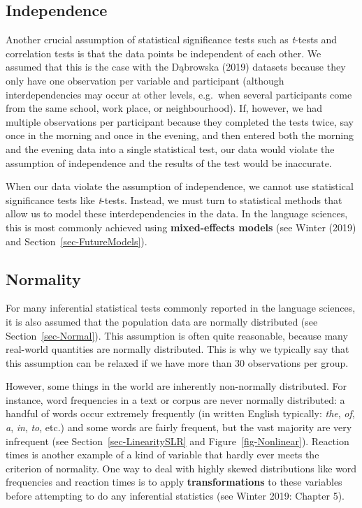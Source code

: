 \documentclass[
  letterpaper,
  DIV=11,
  numbers=noendperiod]{scrreprt}
\begin{document}
\subsection{Independence}\label{sec-Independence}

Another crucial assumption of statistical significance tests such as
\emph{t}-tests and correlation tests is that the data points be
independent of each other. We assumed that this is the case with the
Dąbrowska (2019) datasets because they only have one observation per
variable and participant (although interdependencies may occur at other
levels, e.g.~when several participants come from the same school, work
place, or neighbourhood). If, however, we had multiple observations per
participant because they completed the tests twice, say once in the
morning and once in the evening, and then entered both the morning and
the evening data into a single statistical test, our data would violate
the assumption of independence and the results of the test would be
inaccurate.

When our data violate the assumption of independence, we cannot use
statistical significance tests like \emph{t}-tests. Instead, we must
turn to statistical methods that allow us to model these
interdependencies in the data. In the language sciences, this is most
commonly achieved using \textbf{mixed-effects models} (see Winter (2019)
and Section~\ref{sec-FutureModels}).

\subsection{Normality}\label{sec-Normality}

For many inferential statistical tests commonly reported in the language
sciences, it is also assumed that the population data are normally
distributed (see Section~\ref{sec-Normal}). This assumption is often
quite reasonable, because many real-world quantities are normally
distributed. This is why we typically say that this assumption can be
relaxed if we have more than 30 observations per group.

However, some things in the world are inherently non-normally
distributed. For instance, word frequencies in a text or corpus are
never normally distributed: a handful of words occur extremely
frequently (in written English typically: \emph{the}, \emph{of},
\emph{a}, \emph{in}, \emph{to}, etc.) and some words are fairly
frequent, but the vast majority are very infrequent (see
Section~\ref{sec-LinearitySLR} and Figure~\ref{fig-Nonlinear}). Reaction
times is another example of a kind of variable that hardly ever meets
the criterion of normality. One way to deal with highly skewed
distributions like word frequencies and reaction times is to apply
\textbf{transformations} to these variables before attempting to do any
inferential statistics (see Winter 2019: Chapter 5).
\end{document}
